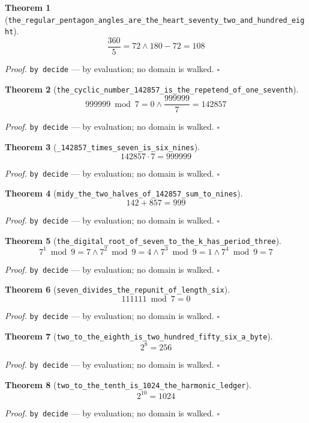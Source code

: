 \documentclass[11pt]{article}
\newtheorem{theorem}{Theorem}[section]
\begin{document}
\begin{theorem}[\texttt{the\_regular\_pentagon\_angles\_are\_the\_heart\_seventy\_two\_and\_hundred\_eight}]
\[ \frac{360}{5} = 72 \land 180 - 72 = 108 \]
\end{theorem}
\noindent\emph{Proof.} \texttt{by decide} --- by evaluation; no domain is walked. \hfill$\square$

\begin{theorem}[\texttt{the\_cyclic\_number\_142857\_is\_the\_repetend\_of\_one\_seventh}]
\[ 999999 \bmod 7 = 0 \land \frac{999999}{7} = 142857 \]
\end{theorem}
\noindent\emph{Proof.} \texttt{by decide} --- by evaluation; no domain is walked. \hfill$\square$

\begin{theorem}[\texttt{\_142857\_times\_seven\_is\_six\_nines}]
\[ 142857 \cdot 7 = 999999 \]
\end{theorem}
\noindent\emph{Proof.} \texttt{by decide} --- by evaluation; no domain is walked. \hfill$\square$

\begin{theorem}[\texttt{midy\_the\_two\_halves\_of\_142857\_sum\_to\_nines}]
\[ 142 + 857 = 999 \]
\end{theorem}
\noindent\emph{Proof.} \texttt{by decide} --- by evaluation; no domain is walked. \hfill$\square$

\begin{theorem}[\texttt{the\_digital\_root\_of\_seven\_to\_the\_k\_has\_period\_three}]
\[ 7^{1} \bmod 9 = 7 \land 7^{2} \bmod 9 = 4 \land 7^{3} \bmod 9 = 1 \land 7^{4} \bmod 9 = 7 \]
\end{theorem}
\noindent\emph{Proof.} \texttt{by decide} --- by evaluation; no domain is walked. \hfill$\square$

\begin{theorem}[\texttt{seven\_divides\_the\_repunit\_of\_length\_six}]
\[ 111111 \bmod 7 = 0 \]
\end{theorem}
\noindent\emph{Proof.} \texttt{by decide} --- by evaluation; no domain is walked. \hfill$\square$

\begin{theorem}[\texttt{two\_to\_the\_eighth\_is\_two\_hundred\_fifty\_six\_a\_byte}]
\[ 2^{8} = 256 \]
\end{theorem}
\noindent\emph{Proof.} \texttt{by decide} --- by evaluation; no domain is walked. \hfill$\square$

\begin{theorem}[\texttt{two\_to\_the\_tenth\_is\_1024\_the\_harmonic\_ledger}]
\[ 2^{10} = 1024 \]
\end{theorem}
\noindent\emph{Proof.} \texttt{by decide} --- by evaluation; no domain is walked. \hfill$\square$
\end{document}

